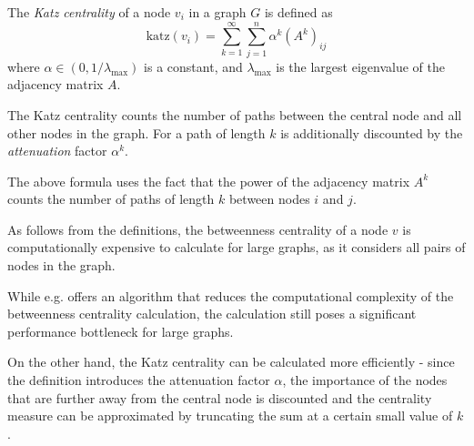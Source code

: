 \begin{definition}
    The \textit{Katz centrality} of a node $v_i$ in a graph $G$ is defined as
    $$
    \text{katz}(v_i) = \sum_{k=1}^{\infty} \sum_{j=1}^n \alpha^k (A^k)_{ij}
    $$
    where $\alpha \in (0, 1/\lambda_{\text{max}})$ is a constant, and $\lambda_{\text{max}}$ is the largest eigenvalue of the adjacency matrix $A$.

    The Katz centrality counts the number of paths between the central node and all other nodes in the graph.
    For a path of length $k$ is additionally discounted by the \textit{attenuation} factor $\alpha^k$.

    The above formula uses the fact that the power of the adjacency matrix $A^k$ counts the number of paths of length $k$ between nodes $i$ and $j$.
\end{definition}

\begin{mybox}{}
As follows from the definitions, the betweenness centrality of a node $v$ is computationally expensive 
to calculate for large graphs, as it considers all pairs of nodes in the graph.

While e.g. \cite{brandes-faster-centrality} offers an algorithm that reduces the computational complexity of the betweenness centrality calculation,
the calculation still poses a significant performance bottleneck for large graphs.

On the other hand, the Katz centrality can be calculated more efficiently - since the definition introduces 
the attenuation factor $\alpha$, the importance of the nodes that are further away from the central node is discounted
and the centrality measure can be approximated by truncating the sum at a certain small value of $k$.
\end{mybox}
